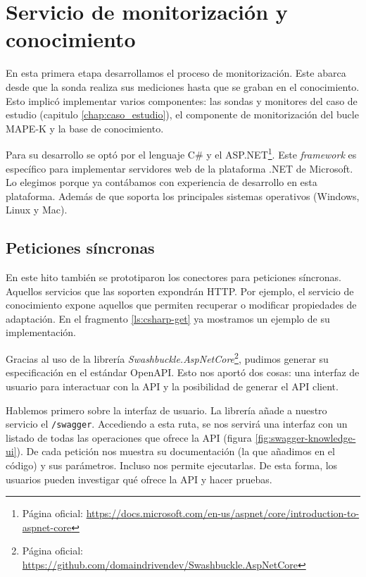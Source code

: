 \section{Servicio de monitorización y conocimiento}

En esta primera etapa desarrollamos el proceso de monitorización. Este abarca desde que la sonda realiza sus mediciones hasta que se graban en el conocimiento. Esto implicó implementar varios componentes: las sondas y monitores del caso de estudio (capitulo \ref{chap:caso_estudio}), el componente de monitorización del bucle MAPE-K y la base de conocimiento.

Para su desarrollo se optó por el lenguaje C\# y el  ASP.NET\footnote{Página oficial: \url{https://docs.microsoft.com/en-us/aspnet/core/introduction-to-aspnet-core}}. Este \emph{framework} es específico para implementar servidores web de la plataforma .NET de Microsoft. Lo elegimos porque ya contábamos con experiencia de desarrollo en esta plataforma. Además de que soporta los principales sistemas operativos (Windows, Linux y Mac).

\subsection{Peticiones síncronas}

En este hito también se prototiparon los conectores para peticiones síncronas. Aquellos servicios que las soporten expondrán  HTTP. Por ejemplo, el servicio de conocimiento expone aquellos que permiten recuperar o modificar propiedades de adaptación.  En el fragmento \ref{ls:csharp-get} ya mostramos un ejemplo de su implementación.

Gracias al uso de la librería \emph{Swashbuckle.AspNetCore}\footnote{Página oficial: \url{https://github.com/domaindrivendev/Swashbuckle.AspNetCore}}, pudimos generar su especificación en el estándar OpenAPI. Esto nos aportó dos cosas: una interfaz de usuario para interactuar con la API y la posibilidad de generar el API client.

Hablemos primero sobre la interfaz de usuario. La librería añade a nuestro servicio el  \texttt{/swagger}. Accediendo a esta ruta, se nos servirá una interfaz con un listado de todas las operaciones que ofrece la API (figura \ref{fig:swagger-knowledge-ui}). De cada petición nos muestra su documentación (la que añadimos en el código) y sus parámetros. Incluso nos permite ejecutarlas. De esta forma, los usuarios pueden investigar qué ofrece la API y hacer pruebas.

